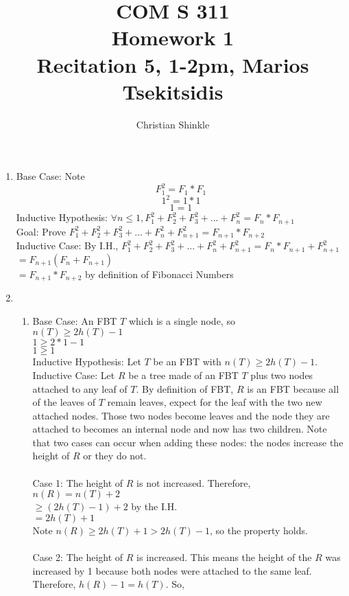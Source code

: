 \documentclass{article}
\begin{document}
 	\title{COM S 311\large \\Homework 1\\Recitation 5, 1-2pm, Marios Tsekitsidis}
	\author{Christian Shinkle}
	\maketitle
	\begin{enumerate}
		\item Base Case: Note
		\[F^2_1=F_1*F_1\]
		\[1^2=1*1\]
		\[1=1\]
		Inductive Hypothesis: $\forall n\leq 1, F^2_1+F^2_2+F^2_3+...+F^2_n=F_n*F_{n+1}$\\
		Goal: Prove $F^2_1+F^2_2+F^2_3+...+F^2_n+F^2_{n+1}=F_{n+1}*F_{n+2}$\\
		Inductive Case: By I.H., 
		$F^2_1+F^2_2+F^2_3+...+F^2_n+F^2_{n+1}=F_n*F_{n+1}+F^2_{n+1}$\\
		$=F_{n+1}(F_n+F_{n+1})$\\
		$=F_{n+1}*F_{n+2}$ by definition of Fibonacci Numbers\\ 
		\item
		\begin{enumerate}
		\item Base Case: An FBT $T$ which is a single node, so\\
		$n(T)\geq 2h(T)-1$\\
		$1\geq 2*1-1$\\
		$1\geq1$\\
		Inductive Hypothesis: Let $T$ be an FBT with $n(T)\geq2h(T)-1.$\\
		Inductive Case: Let $R$ be a tree made of an FBT $T$ plus two nodes attached to any leaf of $T$. By definition of FBT, $R$ is an FBT because all of the leaves of $T$ remain leaves, expect for the leaf with the two new attached nodes. Those two nodes become leaves and the node they are attached to becomes an internal node and now has two children. Note that two cases can occur when adding these nodes: the nodes increase the height of $R$ or they do not.\\ \\
		Case 1: The height of $R$ is not increased. Therefore, \\
		$n(R)=n(T)+2$\\ 
		$\geq(2h(T)-1)+2$ by the I.H.\\
		$=2h(T)+1$\\
		Note $n(R)\geq2h(T)+1>2h(T)-1$, so the property holds.\\ \\
		Case 2: The height of $R$ is increased. This means the height of the $R$ was increased by 1 because both nodes were attached to the same leaf. Therefore, $h(R)-1=h(T)$. So,\\

\end{enumerate}
\end{enumerate}
\end{document}
